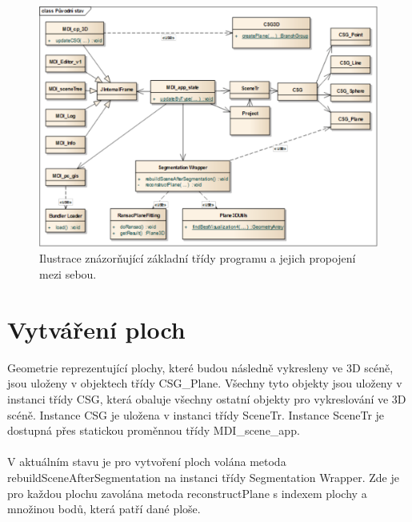 \documentclass[11pt,twoside,a4paper]{book}
\begin{document}
\clearpage

\begin{figure}[h]
	\begin{center}
		\includegraphics[width=15cm]{ilustrace/StateBefore}
		\caption{Ilustrace znázorňující základní třídy programu a jejich propojení mezi sebou.\protect\footnotemark}
		\label{fig:stateBefore}
	\end{center}
\end{figure}



\section{Vytváření ploch}
\label{vytvareniPlochy}
Geometrie reprezentující plochy, které budou následně vykresleny ve 3D scéně, jsou uloženy v objektech třídy CSG\_Plane. Všechny tyto objekty jsou uloženy v instanci třídy CSG, která obaluje všechny ostatní objekty pro vykreslování ve 3D scéně. Instance CSG je uložena v instanci třídy SceneTr. Instance SceneTr je dostupná přes statickou proměnnou třídy MDI\_scene\_app. 
\paragraph{}
V aktuálním stavu je pro vytvoření ploch volána metoda rebuildSceneAfterSegmentation na instanci třídy Segmentation Wrapper. Zde je pro každou plochu zavolána metoda reconstructPlane s indexem plochy a množinou bodů, která patří dané ploše. 
\end{document}

